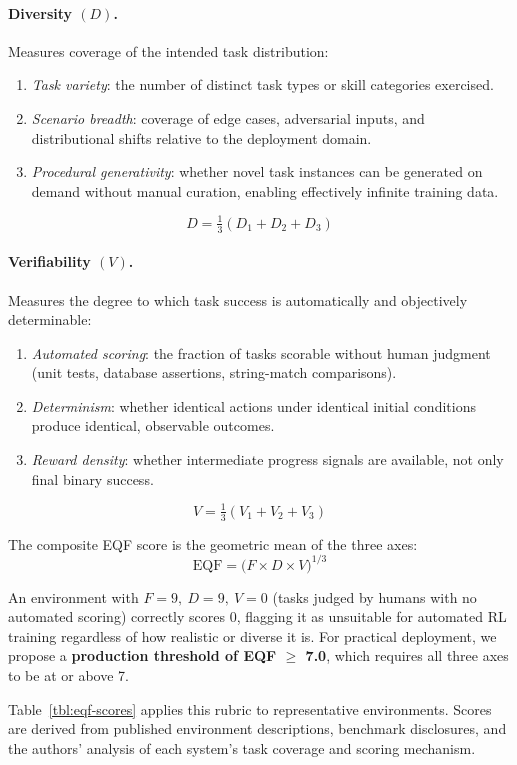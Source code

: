\paragraph{Diversity \boldmath$(D)$.} Measures coverage of the intended task distribution:
\begin{enumerate}[label=D\arabic*.,leftmargin=2.5em]
    \item \emph{Task variety}: the number of distinct task types or skill categories exercised.
    \item \emph{Scenario breadth}: coverage of edge cases, adversarial inputs, and distributional shifts relative to the deployment domain.
    \item \emph{Procedural generativity}: whether novel task instances can be generated on demand without manual curation, enabling effectively infinite training data.
\end{enumerate}
$$D = \tfrac{1}{3}(D_1 + D_2 + D_3)$$

\paragraph{Verifiability \boldmath$(V)$.} Measures the degree to which task success is automatically and objectively determinable:
\begin{enumerate}[label=V\arabic*.,leftmargin=2.5em]
    \item \emph{Automated scoring}: the fraction of tasks scorable without human judgment (unit tests, database assertions, string-match comparisons).
    \item \emph{Determinism}: whether identical actions under identical initial conditions produce identical, observable outcomes.
    \item \emph{Reward density}: whether intermediate progress signals are available, not only final binary success.
\end{enumerate}
$$V = \tfrac{1}{3}(V_1 + V_2 + V_3)$$

The composite EQF score is the geometric mean of the three axes:
$$\mathrm{EQF} = \bigl(F \times D \times V\bigr)^{1/3}$$

An environment with $F = 9,\ D = 9,\ V = 0$ (tasks judged by humans with no automated scoring) correctly scores 0, flagging it as unsuitable for automated RL training regardless of how realistic or diverse it is. For practical deployment, we propose a \textbf{production threshold of EQF $\geq$ 7.0}, which requires all three axes to be at or above 7.

Table~\ref{tbl:eqf-scores} applies this rubric to representative environments. Scores are derived from published environment descriptions, benchmark disclosures, and the authors' analysis of each system's task coverage and scoring mechanism.

